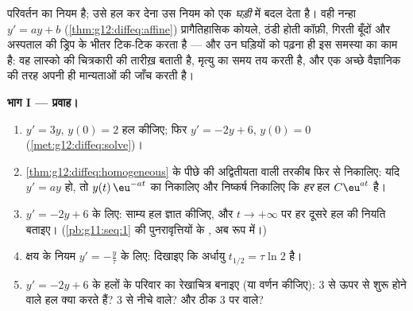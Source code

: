 \begin{problem}
\label{pb:g12:diffeq:1}
 परिवर्तन का नियम है; उसे हल कर देना उस नियम को एक \emph{घड़ी} में
बदल देता है। वही नन्हा  $y' = ay + b$ (\cref{thm:g12:diffeq:affine}) प्रागैतिहासिक कोयले, ठंडी होती
कॉफ़ी, गिरती बूँदों और अस्पताल की ड्रिप के भीतर टिक-टिक करता है --- और उन
घड़ियों को पढ़ना ही इस समस्या का काम है: वह लास्को की चित्रकारी की तारीख़
बताती है, मृत्यु का समय तय करती है, और एक अच्छे वैज्ञानिक की तरह अपनी ही
मान्यताओं की जाँच करती है।

\medskip
\noindent\textbf{भाग I --- प्रवाह।}
\begin{enumerate}
  \item $y' = 3y$, $y(0) = 2$ हल कीजिए; फिर $y' = -2y + 6$, $y(0) = 0$ (\cref{met:g12:diffeq:solve})।
  \item \cref{thm:g12:diffeq:homogeneous} के पीछे की अद्वितीयता वाली तरकीब फिर से निकालिए: यदि $y' = ay$ हो,
        तो $y(t)\,\eu^{-at}$ का  निकालिए और निष्कर्ष निकालिए कि \emph{हर} हल $C\eu^{at}$
        है।
  \item $y' = -2y + 6$ के लिए: साम्य हल ज्ञात कीजिए, और $t \to +\infty$ पर हर दूसरे हल की नियति
        बताइए। (\cref{pb:g11:seq:1} की पुनरावृत्तियों के , अब  रूप में।)
  \item क्षय के नियम $y' = -\frac{y}{\tau}$ के लिए: दिखाइए कि अर्धायु $t_{1/2} = \tau \ln 2$ है।
  \item $y' = -2y + 6$ के हलों के परिवार का रेखाचित्र बनाइए (या वर्णन कीजिए): $3$
        से ऊपर से शुरू होने वाले हल क्या करते हैं? $3$ से नीचे वाले? और
        ठीक $3$ पर वाले?
\end{enumerate}


\end{problem}
